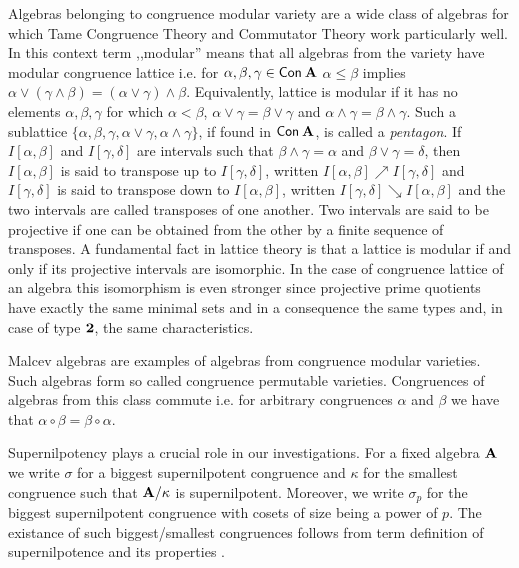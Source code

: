 \documentclass[11pt,a4paper]{amsart}
\newcommand{\m}[1]{{\uppercase {\bf{#1}}}}
\newcommand{\intv}[2]{I\left[#1,#2\right]}
\renewcommand{\leq}{\leqslant}
\newcommand{\join}{\vee}
\newcommand{\meet}{\wedge}
\newcommand{\con}[1]{{\sf Con\:\m{#1}}}
\newcommand{\tn} [1]{{\bf {#1}}}
\begin{document}
Algebras belonging to congruence modular variety are a wide class of algebras for which Tame Congruence Theory and Commutator Theory work particularly well. In this context term ,,modular'' means that all algebras from the variety have modular congruence lattice i.e. for $\alpha,\beta, \gamma\in \con{A}$ $\alpha\leq\beta$ implies $\alpha\join(\gamma\meet\beta)=(\alpha\join\gamma)\meet\beta$.  Equivalently, lattice is modular if it has no elements $\alpha,\beta,\gamma$ for which $\alpha<\beta$, $\alpha\join\gamma=\beta\join\gamma$ and $\alpha\meet \gamma=\beta\meet \gamma$. Such a sublattice $\{\alpha, \beta, \gamma, \alpha\join\gamma, \alpha\meet\gamma\}$, if found in $\con{A}$, is called a \textit{pentagon}.   If $\intv{\alpha}{\beta}$ and $\intv{\gamma}{\delta}$ are intervals such that $\beta\meet\gamma = \alpha$ and
$\beta\join \gamma = \delta$, then $\intv{\alpha}{\beta}$ is said to transpose up to $\intv{\gamma}{\delta}$, written $\intv{\alpha}{\beta}\nearrow\intv{\gamma}{\delta}$ and $\intv{\gamma}{\delta}$ is said to transpose down to $\intv{\alpha}{\beta}$, written $\intv{\gamma}{\delta}\searrow\intv{\alpha}{\beta}$ and the two intervals are called transposes of one another. Two intervals are said
to be projective if one can be obtained from the other by a finite sequence of transposes. A fundamental fact in lattice theory is that a lattice is modular if and only if its projective intervals are isomorphic. In the case of congruence lattice of an algebra this isomorphism is even stronger since projective prime  quotients have exactly the same minimal sets and in a consequence the same types and, in case of type $\tn 2$, the same characteristics.

Malcev algebras are examples of algebras from congruence modular varieties. Such algebras form so called congruence permutable varieties. Congruences of algebras from this class commute i.e.\! for arbitrary congruences $\alpha$ and $\beta$ we have that  $\alpha\circ\beta=\beta\circ\alpha$.   

Supernilpotency plays a crucial role in our investigations. For a fixed algebra $\m A$ we write $\sigma$ for a biggest supernilpotent congruence and $\kappa$ for the smallest congruence such that $\m A/\kappa$ is supernilpotent. Moreover, we write $\sigma_p$ for the biggest supernilpotent congruence with cosets of size being a power of $p$. The existance of such biggest/smallest congruences follows from term definition of supernilpotence and its properties \cite[Corollary 6.6]{aichmud-2010}. 
\end{document}
